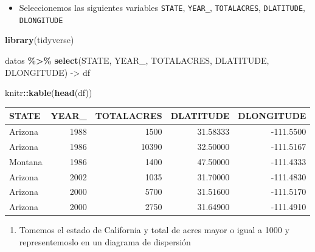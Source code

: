 \documentclass[
]{book}
\newenvironment{Shaded}{\begin{snugshade}}{\end{snugshade}}
\newcommand{\FunctionTok}[1]{\textcolor[rgb]{0.13,0.29,0.53}{\textbf{#1}}}
\newcommand{\NormalTok}[1]{#1}
\newcommand{\OtherTok}[1]{\textcolor[rgb]{0.56,0.35,0.01}{#1}}
\newcommand{\SpecialCharTok}[1]{\textcolor[rgb]{0.81,0.36,0.00}{\textbf{#1}}}
\providecommand{\tightlist}{%
  \setlength{\itemsep}{0pt}\setlength{\parskip}{0pt}}
\begin{document}
\begin{itemize}
\tightlist
\item
  Seleccionemos las siguientes variables \texttt{STATE}, \texttt{YEAR\_}, \texttt{TOTALACRES}, \texttt{DLATITUDE}, \texttt{DLONGITUDE}
\end{itemize}

\begin{Shaded}
\begin{Highlighting}[]
\FunctionTok{library}\NormalTok{(tidyverse)}

\NormalTok{datos }\SpecialCharTok{\%\textgreater{}\%}  
  \FunctionTok{select}\NormalTok{(STATE, YEAR\_, TOTALACRES, DLATITUDE, DLONGITUDE) }\OtherTok{{-}\textgreater{}}\NormalTok{ df}

\NormalTok{knitr}\SpecialCharTok{::}\FunctionTok{kable}\NormalTok{(}\FunctionTok{head}\NormalTok{(df))}
\end{Highlighting}
\end{Shaded}

\begin{tabular}{l|r|r|r|r}
\hline
STATE & YEAR\_ & TOTALACRES & DLATITUDE & DLONGITUDE\\
\hline
Arizona & 1988 & 1500 & 31.58333 & -111.5500\\
\hline
Arizona & 1986 & 10390 & 32.50000 & -111.5167\\
\hline
Montana & 1986 & 1400 & 47.50000 & -111.4333\\
\hline
Arizona & 2002 & 1035 & 31.70000 & -111.4830\\
\hline
Arizona & 2000 & 5700 & 31.51600 & -111.5170\\
\hline
Arizona & 2000 & 2750 & 31.64900 & -111.4910\\
\hline
\end{tabular}

\begin{enumerate}
\def\labelenumi{\arabic{enumi}.}
\setcounter{enumi}{1}
\tightlist
\item
  Tomemos el estado de California y total de acres mayor o igual a 1000 y representemoslo en un diagrama de dispersión
\end{enumerate}
\end{document}
